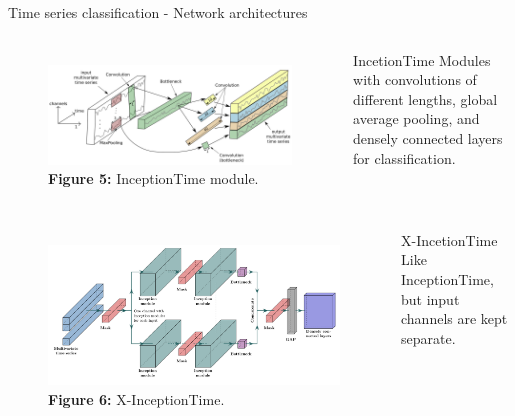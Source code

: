 \begin{frame}[fragile]{Time series classification - Network architectures}
  \begin{columns}[c,onlytextwidth]
    \begin{figure}
      \centering
      \includegraphics[width=\textwidth]{files/figs/tsc/inception-time-module.png}
      {\scriptsize\textbf{Figure 5:} InceptionTime module.}
    \end{figure}

  \begin{block}{IncetionTime\footnotemark}
    Modules with convolutions of different lengths, global average pooling, and densely connected layers for classification.
  \end{block}
  \end{columns}

  \begin{columns}[c,onlytextwidth]
    \begin{figure}
      \centering
      \includegraphics[width=\textwidth]{files/figs/met/x-inception-w-masks.pdf}
      {\scriptsize\textbf{Figure 6:} X-InceptionTime.}
    \end{figure}

  \begin{block}{X-IncetionTime}
    Like InceptionTime, but input channels are kept separate.
  \end{block}
  \end{columns}

\end{frame}

